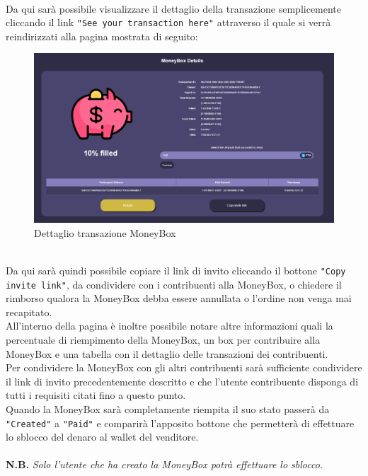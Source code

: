             \textbf{}\\
            Da qui sarà possibile visualizzare il dettaglio della transazione semplicemente cliccando il link \texttt{"See your transaction here"} attraverso il quale si verrà reindirizzati alla pagina mostrata di seguito:
            \begin{figure}[H]
                \centering
                \includegraphics[scale=0.4]{immagini/Checkout/MoneyBoxDetails.png}
                \caption{Dettaglio transazione MoneyBox}
            \end{figure}
            \textbf{}\\
            Da qui sarà quindi possibile copiare il link di invito cliccando il bottone \texttt{"Copy invite link"}, da condividere con i contribuenti alla MoneyBox, o chiedere il rimborso qualora la MoneyBox debba essere annullata o l'ordine non venga mai recapitato.\\
            All'interno della pagina è inoltre possibile notare altre informazioni quali la percentuale di riempimento della MoneyBox, un box per contribuire alla MoneyBox e una tabella con il dettaglio delle transazioni dei contribuenti.\\
            Per condividere la MoneyBox con gli altri contribuenti sarà sufficiente condividere il link di invito precedentemente descritto e che l'utente contribuente disponga di tutti i requisiti citati fino a questo punto.\\
            Quando la MoneyBox sarà completamente riempita il suo stato passerà da \texttt{"Created"} a \texttt{"Paid"} e comparirà l'apposito bottone che permetterà di effettuare lo sblocco del denaro al wallet del venditore.\\\\ 
            \textbf{N.B.} \textit{Solo l'utente che ha creato la MoneyBox potrà effettuare lo sblocco.}\\\\
